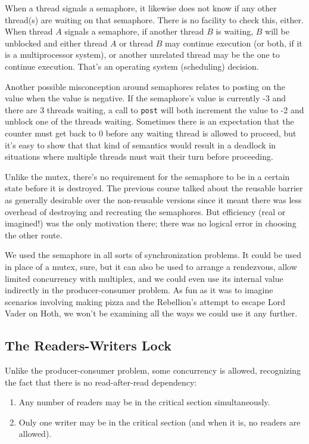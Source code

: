 When a thread signals a semaphore, it likewise does not know if any other thread(s) are waiting on that semaphore. There is no facility to check this, either. When thread $A$ signals a semaphore, if another thread $B$ is waiting, $B$ will be unblocked and either thread $A$ or thread $B$ may continue execution (or both, if it is a multiprocessor system), or another unrelated thread may be the one to continue execution. That's an operating system (scheduling) decision.

Another possible misconception around semaphores relates to posting on the value when the value is negative. If the semaphore's value is currently -3 and there are 3 threads waiting, a call to \texttt{post} will both increment the value to -2 and unblock one of the threads waiting. Sometimes there is an expectation that the counter must get back to 0 before any waiting thread is allowed to proceed, but it's easy to show that that kind of semantics would result in a deadlock in situations where multiple threads must wait their turn before proceeding.

Unlike the mutex, there's no requirement for the semaphore to be in a certain state before it is destroyed. The previous course talked about the reusable barrier as generally desirable over the non-reusable versions since it meant there was less overhead of destroying and recreating the semaphores. But efficiency (real or imagined!) was the only motivation there; there was no logical error in choosing the other route.

We used the semaphore in all sorts of synchronization problems. It could be used in place of a mutex, sure, but it can also be used to arrange a rendezvous, allow limited concurrency with multiplex, and we could even use its internal value indirectly in the producer-consumer problem. As fun as it was to imagine scenarios involving making pizza and the Rebellion's attempt to escape Lord Vader on Hoth, we won't be examining all the ways we could use it any further.

\subsection*{The Readers-Writers Lock}

Unlike the producer-consumer problem, some concurrency is allowed, recognizing the fact that there is no read-after-read dependency:

\begin{enumerate}
	\item Any number of readers may be in the critical section simultaneously.
	\item Only one writer may be in the critical section (and when it is, no readers are allowed).
\end{enumerate}

